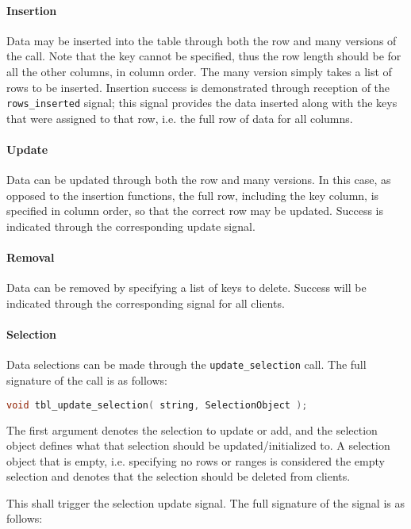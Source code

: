\documentclass[11pt, oneside]{amsart}
\begin{document}
\paragraph{\textbf{Insertion}} Data may be inserted into the table through both the row and many versions of the call. Note that the key cannot be specified, thus the row length should be for all the other columns, in column order. The many version simply takes a list of rows to be inserted. Insertion success is demonstrated through reception of the \texttt{rows\_inserted} signal; this signal provides the data inserted along with the keys that were assigned to that row, i.e. the full row of data for all columns.

\paragraph{\textbf{Update}} Data can be updated through both the row and many versions. In this case, as opposed to the insertion functions, the full row, including the key column, is specified in column order, so that the correct row may be updated. Success is indicated through the corresponding update signal.

\paragraph{\textbf{Removal}} Data can be removed by specifying a list of keys to delete. Success will be indicated through the corresponding signal for all clients.

\paragraph{\textbf{Selection}} Data selections can be made through the \texttt{update\_selection} call. The full signature of the call is as follows:

\begin{lstlisting}[language=c++]
	void tbl_update_selection( string, SelectionObject );
\end{lstlisting}

The first argument denotes the selection to update or add, and the selection object defines what that selection should be updated/initialized to. A selection object that is empty, i.e. specifying no rows or ranges is considered the empty selection and denotes that the selection should be deleted from clients.

This shall trigger the selection update signal. The full signature of the signal is as follows:
\end{document}
